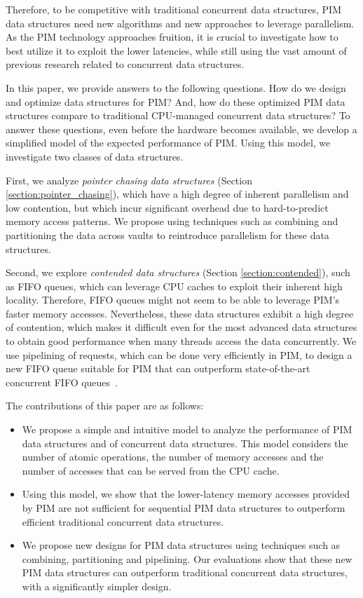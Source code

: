 Therefore, to be competitive with traditional concurrent data structures, 
PIM data structures need new algorithms and new approaches to leverage 
parallelism.  
As the PIM technology approaches fruition, it is crucial to investigate how to 
best utilize it to exploit the lower latencies, while still using the vast amount of previous research 
related to concurrent data structures. 

In this paper, we provide answers to the following questions. 
How do we design and optimize data structures for PIM? And, how do these 
optimized PIM data structures compare to traditional CPU-managed concurrent data structures? To 
answer these questions, even before the hardware becomes available, we develop a 
simplified model of the expected performance of PIM. Using this model, we 
investigate two classes of data structures. 

First, we analyze \emph{pointer chasing data structures} (Section 
\ref{section:pointer_chasing}), 
which have a high degree of inherent parallelism and low contention, 
but which incur significant overhead due to hard-to-predict memory access patterns. 
We propose using techniques such as combining and partitioning 
the data across vaults to reintroduce parallelism for these data structures.

Second, we explore \emph{contended data structures} (Section 
\ref{section:contended}), such as FIFO queues, 
which can leverage CPU caches to exploit their inherent high locality. 
Therefore, FIFO queues might not seem to be able to leverage PIM's faster memory 
accesses. 
Nevertheless, these data structures exhibit a high degree of contention, which 
makes it difficult even for 
the most advanced data structures to obtain good performance when many threads access 
the data concurrently. 
We use pipelining of requests, which can be done very efficiently in PIM, to 
design a new FIFO queue 
suitable for PIM that can outperform state-of-the-art concurrent FIFO 
queues~\cite{Morrison13, Hendler10}.

The contributions of this paper are as follows:
\begin{itemize}
\item We propose a simple and intuitive model to analyze the performance of PIM data 
structures and of 
concurrent data structures. This model considers the number of atomic operations, the number of 
memory accesses and the number of accesses that can be served from the CPU cache. 
\item Using this model, we show that the lower-latency memory accesses provided 
by PIM 
are not sufficient for sequential PIM data structures to outperform efficient traditional concurrent 
data structures.
 \item We propose new designs for PIM data structures using 
techniques such as combining, partitioning and pipelining.
Our evaluations show that these new PIM data structures can outperform 
traditional 
concurrent data structures, with a significantly simpler design. 
\end{itemize}

